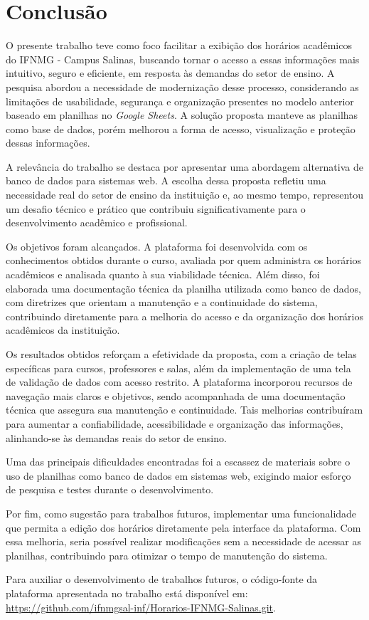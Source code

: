 \chapter{Conclusão} 
\label{cap6_conclusao} 

O presente trabalho teve como foco facilitar a exibição dos horários acadêmicos do IFNMG - Campus Salinas, buscando tornar o acesso a essas informações mais intuitivo, seguro e eficiente, em resposta às demandas do setor de ensino. A pesquisa abordou a necessidade de modernização desse processo, considerando as limitações de usabilidade, segurança e organização presentes no modelo anterior baseado em planilhas no \textit{Google Sheets}. A solução proposta manteve as planilhas como base de dados, porém melhorou a forma de acesso, visualização e proteção dessas informações.

A relevância do trabalho se destaca por apresentar uma abordagem alternativa de banco de dados para sistemas web. A escolha dessa proposta refletiu uma necessidade real do setor de ensino da instituição e, ao mesmo tempo, representou um desafio técnico e prático que contribuiu significativamente para o desenvolvimento acadêmico e profissional.

Os objetivos foram alcançados. A plataforma foi desenvolvida com os conhecimentos obtidos durante o curso, avaliada por quem administra os horários acadêmicos e analisada quanto à sua viabilidade técnica. Além disso, foi elaborada uma documentação técnica da planilha utilizada como banco de dados, com diretrizes que orientam a manutenção e a continuidade do sistema, contribuindo diretamente para a melhoria do acesso e da organização dos horários acadêmicos da instituição.

Os resultados obtidos reforçam a efetividade da proposta, com a criação de telas específicas para cursos, professores e salas, além da implementação de uma tela de validação de dados com acesso restrito. A plataforma incorporou recursos de navegação mais claros e objetivos, sendo acompanhada de uma documentação técnica que assegura sua manutenção e continuidade. Tais melhorias contribuíram para aumentar a confiabilidade, acessibilidade e organização das informações, alinhando-se às demandas reais do setor de ensino.

Uma das principais dificuldades encontradas foi a escassez de materiais sobre o uso de planilhas como banco de dados em sistemas web, exigindo maior esforço de pesquisa e testes durante o desenvolvimento.

Por fim, como sugestão para trabalhos futuros, implementar uma funcionalidade que permita a edição dos horários diretamente pela interface da plataforma. Com essa melhoria, seria possível realizar modificações sem a necessidade de acessar as planilhas, contribuindo para otimizar o tempo de manutenção do sistema.

Para auxiliar o desenvolvimento de trabalhos futuros, o código-fonte da plataforma apresentada no trabalho está disponível em: \url{https://github.com/ifnmgsal-inf/Horarios-IFNMG-Salinas.git}.